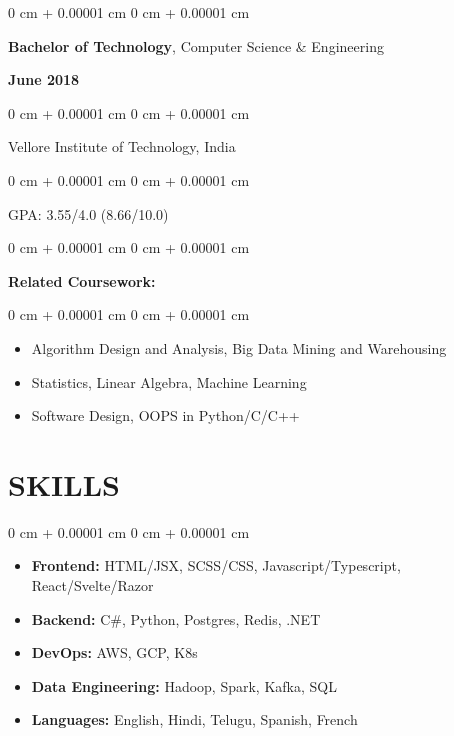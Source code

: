 \documentclass[10pt, letterpaper]{article}
\newenvironment{highlights}{
    \begin{itemize}[
        topsep=0.10 cm,
        parsep=0.10 cm,
        partopsep=0pt,
        itemsep=0pt,
        leftmargin=0 cm + 10pt
    ]
}{
    \end{itemize}
} %
\newenvironment{highlightsforbulletentries}{
    \begin{itemize}[
        topsep=0.10 cm,
        parsep=0.10 cm,
        partopsep=0pt,
        itemsep=0pt,
        leftmargin=10pt
    ]
}{
    \end{itemize}
} %
\newenvironment{onecolentry}{
    \begin{adjustwidth}{
        0 cm + 0.00001 cm
    }{
        0 cm + 0.00001 cm
    }
}{
    \end{adjustwidth}
} %
\newenvironment{twocolentry}[2][]{
    \onecolentry
    \def\secondColumn{#2}
    \setcolumnwidth{\fill, 4.5 cm}
    \begin{paracol}{2}
}{
    \switchcolumn \raggedleft \secondColumn
    \end{paracol}
    \endonecolentry
} %
\begin{document}
\vspace{0.10 cm}
        
        \begin{twocolentry}{
            \textbf{June 2018}
        }
            \textbf{Bachelor of Technology}, Computer Science \& Engineering
            \end{twocolentry}
\begin{onecolentry}
   Vellore Institute of Technology, India
\end{onecolentry}
\begin{onecolentry}
    GPA: 3.55/4.0 (8.66/10.0)
\end{onecolentry}
        \vspace{0.20 cm}
        \begin{onecolentry}
            \textbf{Related Coursework:}
        \end{onecolentry}
         \vspace{0.05 cm}
        \begin{onecolentry}
            \begin{highlights}
                \item Algorithm Design and Analysis, Big Data Mining and Warehousing
                \item Statistics, Linear Algebra, Machine Learning
                \item Software Design, OOPS in Python/C/C++
            \end{highlights}
        \end{onecolentry}
        \vspace{0.10 cm}
        
\section{SKILLS}
    \begin{onecolentry}
        \begin{highlightsforbulletentries}

        \item \textbf{Frontend:} HTML/JSX, SCSS/CSS, Javascript/Typescript, React/Svelte/Razor
        \item \textbf{Backend:} C\#, Python, Postgres, Redis, .NET
        \item \textbf{DevOps:} AWS, GCP, K8s
        \item \textbf{Data Engineering:} Hadoop, Spark, Kafka, SQL
        \item \textbf{Languages:} English, Hindi, Telugu, Spanish, French

        \end{highlightsforbulletentries}
    \end{onecolentry}
   
\end{document}

